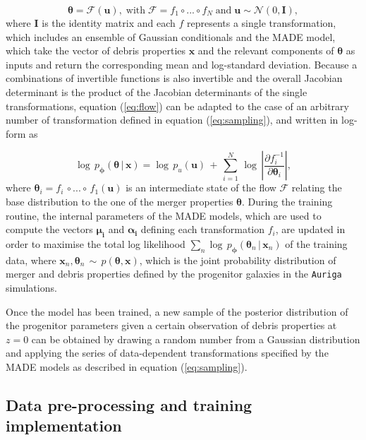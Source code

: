 \begin{equation}
\label{eq:sampling}
\bm{\theta} = \mathcal{F}(\bm{u}), \; \text{with} \; \mathcal{F}= f_{1} \circ ... \circ f_{N} \; \text{and} \; \bm{u} \sim \mathcal{N}(0, \bm{\text{I}}),
\end{equation}
where $\bm{\text{I}}$ is the identity matrix and each $f$ represents a single transformation, which includes an ensemble of Gaussian conditionals and the MADE model, which take the vector of debris properties $\bm{x}$ and the relevant components of $\bm{\theta}$ as inputs and return the corresponding mean and log-standard deviation. Because a combinations of invertible functions is also invertible and the overall Jacobian determinant is the product of the Jacobian determinants of the single transformations, equation (\ref{eq:flow}) can be adapted to the case of an arbitrary  number of transformation defined in equation (\ref{eq:sampling}), and written in log-form as 

\begin{equation}
    \log\,p_{\bm{\phi}}(\bm{\theta} \, | \, \bm{x} ) = \log\,p_{u}(\bm{u}) \, + \, \sum_{i=1}^{N}\,\log\,\left | \frac{\partial f_{i}^{-1}}{\partial \bm{\theta}_i }\right |,
\end{equation}
where $\bm{\theta}_i=f_i\,\circ ... \circ \, f_1(\bm{u})$ is an intermediate state of the flow $\mathcal{F}$ relating the base distribution to the one of the merger properties $\bm{\theta}$.
During the training routine, the internal parameters of the MADE models, which are used to compute the vectors $\bm{\mu_i}$ and $\bm{\alpha_{i}}$ defining each transformation $f_{i}$, are updated in order to maximise the total log likelihood $\sum_{n}\log\,p_{\bm{\phi}}(\bm{\theta}_n\,|\,\bm{x}_n)$ of the training data,  where $\bm{x}_n,\bm{\theta}_n \, \sim \, p(\bm{\theta},\bm{x})$, which is the joint probability distribution of merger and debris properties defined by the progenitor galaxies in the \texttt{Auriga} simulations.

Once the model has been trained, a new sample of the posterior distribution of the progenitor parameters given a certain observation of debris properties at $z=0$ can be obtained by drawing a random number from a Gaussian distribution and applying the series of data-dependent transformations specified by the MADE models as described in equation (\ref{eq:sampling}).
    


\subsection{Data pre-processing and training implementation}
\label{sec:data_preprocessing}

